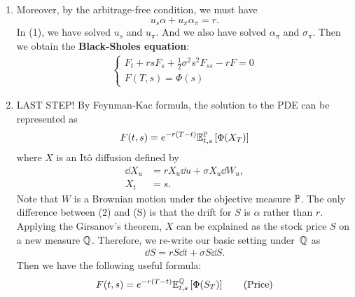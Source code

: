 \begin{enumerate}
		\item Moreover, by the arbitrage-free condition, we must have 
		$$ u_s  \alpha +  u_\pi  \alpha_\pi = r.$$ 
		In (1), we have solved $u_s$ and $u_\pi$. And we also have solved $\alpha_\pi$ and $\sigma_\pi$. Then we obtain the \textbf{Black-Sholes equation}:
		\begin{align*}
			\begin{cases}
			F_t + rs F_s + \frac{1}{2} \sigma^2 s^2 F_{ss} - r F= 0 \\
			F(T,s) = \Phi(s)
			\end{cases} \tag{Black-Sholes}
		\end{align*}
		
		\item LAST STEP! By Feynman-Kac formula, the solution to the PDE can be represented as 
		\begin{align*}
			F(t,s) = e^{-r(T-t)}\mathbb{E}^{\mathbb{P}}_{t,s} \left[  \Phi( X_T ) \right] 
		\end{align*}  
		where $X$ is an It\^o diffusion defined by
		\begin{align*}
			 \dd X_u &= r X_u \dd u + \sigma X_u  \dd W_u, \tag{2} \\
			 X_t &= s.
		\end{align*} 
		Note that $W$ is a Brownian motion under the objective measure $\mathbb{P}$.  The only difference between (2) and (S) is that the drift for $S$ is $\alpha$ rather than $r$. Applying the Girsanov's theorem, $X$ can be explained as the stock price $S$ on a new measure $\mathbb{Q}$. Therefore, we re-write our basic setting under~$\mathbb{Q}$ as 
		\begin{align*}
			\dd S = r S \dd t + \sigma S \dd S.
		\end{align*}
		Then we have the following useful formula:
		\begin{align*}
			F(t,s) = e^{-r(T-t)}\mathbb{E}^{\mathbb{Q}}_{t,s} \left[  \Phi( S_T ) \right] \tag{Price}
		\end{align*} 
	\end{enumerate} 

